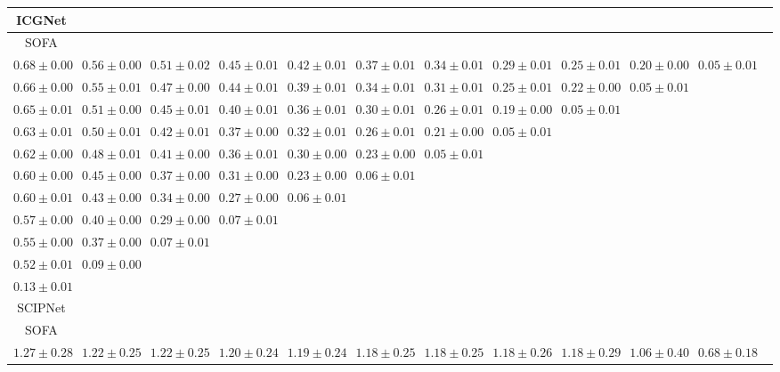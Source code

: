 \begin{table}[ht]
{{\begin{adjustbox}{width=\textwidth}
\begin{tabular}{cccccccccccc}
\hline
ICGNet &  &  &  &  &  &  &  &  &  & \\
\hline
SOFA &  &  &  &  &  &  &  &  &  & \\
\hline
$0.68 \pm 0.00$ & $0.56 \pm 0.00$ & $0.51 \pm 0.02$ & $0.45 \pm 0.01$ & $0.42 \pm 0.01$ & $0.37 \pm 0.01$ & $0.34 \pm 0.01$ & $0.29 \pm 0.01$ & $0.25 \pm 0.01$ & $0.20 \pm 0.00$ & $0.05 \pm 0.01$ &  \\
$0.66 \pm 0.00$ & $0.55 \pm 0.01$ & $0.47 \pm 0.00$ & $0.44 \pm 0.01$ & $0.39 \pm 0.01$ & $0.34 \pm 0.01$ & $0.31 \pm 0.01$ & $0.25 \pm 0.01$ & $0.22 \pm 0.00$ & $0.05 \pm 0.01$ &  &  \\
$0.65 \pm 0.01$ & $0.51 \pm 0.00$ & $0.45 \pm 0.01$ & $0.40 \pm 0.01$ & $0.36 \pm 0.01$ & $0.30 \pm 0.01$ & $0.26 \pm 0.01$ & $0.19 \pm 0.00$ & $0.05 \pm 0.01$ &  &  &  \\
$0.63 \pm 0.01$ & $0.50 \pm 0.01$ & $0.42 \pm 0.01$ & $0.37 \pm 0.00$ & $0.32 \pm 0.01$ & $0.26 \pm 0.01$ & $0.21 \pm 0.00$ & $0.05 \pm 0.01$ &  &  &  &  \\
$0.62 \pm 0.00$ & $0.48 \pm 0.01$ & $0.41 \pm 0.00$ & $0.36 \pm 0.01$ & $0.30 \pm 0.00$ & $0.23 \pm 0.00$ & $0.05 \pm 0.01$ &  &  &  &  &  \\
$0.60 \pm 0.00$ & $0.45 \pm 0.00$ & $0.37 \pm 0.00$ & $0.31 \pm 0.00$ & $0.23 \pm 0.00$ & $0.06 \pm 0.01$ &  &  &  &  &  &  \\
$0.60 \pm 0.01$ & $0.43 \pm 0.00$ & $0.34 \pm 0.00$ & $0.27 \pm 0.00$ & $0.06 \pm 0.01$ &  &  &  &  &  &  &  \\
$0.57 \pm 0.00$ & $0.40 \pm 0.00$ & $0.29 \pm 0.00$ & $0.07 \pm 0.01$ &  &  &  &  &  &  &  &  \\
$0.55 \pm 0.00$ & $0.37 \pm 0.00$ & $0.07 \pm 0.01$ &  &  &  &  &  &  &  &  &  \\
$0.52 \pm 0.01$ & $0.09 \pm 0.00$ &  &  &  &  &  &  &  &  &  &  \\
$0.13 \pm 0.01$ &  &  &  &  &  &  &  &  &  &  &  \\
\hline
SCIPNet &  &  &  &  &  &  &  &  &  & \\
\hline
SOFA &  &  &  &  &  &  &  &  &  & \\
\hline
$1.27 \pm 0.28$ & $1.22 \pm 0.25$ & $1.22 \pm 0.25$ & $1.20 \pm 0.24$ & $1.19 \pm 0.24$ & $1.18 \pm 0.25$ & $1.18 \pm 0.25$ & $1.18 \pm 0.26$ & $1.18 \pm 0.29$ & $1.06 \pm 0.40$ & $0.68 \pm 0.18$ &  \\

\end{tabular}
\end{adjustbox}}}
\end{table}
